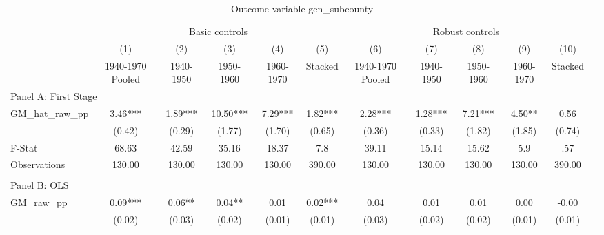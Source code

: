  \begin{table}[htbp]\centering {} \begin{threeparttable} \caption{Outcome variable gen\_subcounty } \begin{tabular}{l*{11}{c}} \toprule
          &\multicolumn{5}{c}{Basic controls}                                   &\multicolumn{5}{c}{Robust controls}                                  \\\cmidrule(lr){2-6}\cmidrule(lr){7-11}
          &\multicolumn{1}{c}{(1)}&\multicolumn{1}{c}{(2)}&\multicolumn{1}{c}{(3)}&\multicolumn{1}{c}{(4)}&\multicolumn{1}{c}{(5)}&\multicolumn{1}{c}{(6)}&\multicolumn{1}{c}{(7)}&\multicolumn{1}{c}{(8)}&\multicolumn{1}{c}{(9)}&\multicolumn{1}{c}{(10)}\\
          &\multicolumn{1}{c}{1940-1970 Pooled}&\multicolumn{1}{c}{1940-1950}&\multicolumn{1}{c}{1950-1960}&\multicolumn{1}{c}{1960-1970}&\multicolumn{1}{c}{Stacked}&\multicolumn{1}{c}{1940-1970 Pooled}&\multicolumn{1}{c}{1940-1950}&\multicolumn{1}{c}{1950-1960}&\multicolumn{1}{c}{1960-1970}&\multicolumn{1}{c}{Stacked}\\
\cmidrule(lr){1-11}
\multicolumn{10}{l}{Panel A: First Stage}\\
\cmidrule(lr){1-11}
GM\_hat\_raw\_pp&      3.46***&      1.89***&     10.50***&      7.29***&      1.82***&      2.28***&      1.28***&      7.21***&      4.50** &      0.56   \\
          &    (0.42)   &    (0.29)   &    (1.77)   &    (1.70)   &    (0.65)   &    (0.36)   &    (0.33)   &    (1.82)   &    (1.85)   &    (0.74)   \\
\midrule
F-Stat    &     68.63   &     42.59   &     35.16   &     18.37   &       7.8   &     39.11   &     15.14   &     15.62   &       5.9   &       .57   \\
Observations&    130.00   &    130.00   &    130.00   &    130.00   &    390.00   &    130.00   &    130.00   &    130.00   &    130.00   &    390.00   \\
\cmidrule[\heavyrulewidth](lr){1-11} \\ \cmidrule[\heavyrulewidth](lr){1-11}
\multicolumn{10}{l}{Panel B: OLS}\\
\cmidrule(lr){1-11}
GM\_raw\_pp &      0.09***&      0.06** &      0.04** &      0.01   &      0.02***&      0.04   &      0.01   &      0.01   &      0.00   &     -0.00   \\
          &    (0.02)   &    (0.03)   &    (0.02)   &    (0.01)   &    (0.01)   &    (0.03)   &    (0.02)   &    (0.02)   &    (0.01)   &    (0.01)   \\

\end{tabular}
\end{threeparttable}
\end{table}
